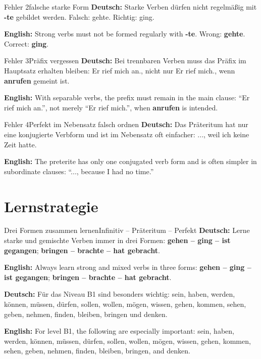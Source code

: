 \documentclass[a4paper,11pt]{article}
\newcommand{\GermanText}[1]{\textbf{Deutsch: }#1\par}
\newcommand{\EnglishText}[1]{{\small\color{SoftGray}\textbf{English: }#1\par}}
\begin{document}
        \begin{grammarentry}{Fehler 2}{falsche starke Form}
            \GermanText{Starke Verben dürfen nicht regelmäßig mit \textbf{-te} gebildet werden. Falsch: \glqq gehte\grqq. Richtig: \glqq ging\grqq.}
            \EnglishText{Strong verbs must not be formed regularly with \textbf{-te}. Wrong: \textbf{gehte}. Correct: \textbf{ging}.}
        \end{grammarentry}
        
        \begin{grammarentry}{Fehler 3}{Präfix vergessen}
            \GermanText{Bei trennbaren Verben muss das Präfix im Hauptsatz erhalten bleiben: \glqq Er rief mich an.\grqq, nicht nur \glqq Er rief mich.\grqq, wenn \textbf{anrufen} gemeint ist.}
            \EnglishText{With separable verbs, the prefix must remain in the main clause: ``Er rief mich an.'', not merely ``Er rief mich.'', when \textbf{anrufen} is intended.}
        \end{grammarentry}
        
        \begin{grammarentry}{Fehler 4}{Perfekt im Nebensatz falsch ordnen}
            \GermanText{Das Präteritum hat nur eine konjugierte Verbform und ist im Nebensatz oft einfacher: \glqq ..., weil ich keine Zeit hatte.\grqq}
            \EnglishText{The preterite has only one conjugated verb form and is often simpler in subordinate clauses: ``..., because I had no time.''}
        \end{grammarentry}
    
    
    \section{Lernstrategie}
        
        \begin{grammarentry}{Drei Formen zusammen lernen}{Infinitiv -- Präteritum -- Perfekt}
            \GermanText{Lerne starke und gemischte Verben immer in drei Formen: \textbf{gehen -- ging -- ist gegangen}; \textbf{bringen -- brachte -- hat gebracht}.}
            \EnglishText{Always learn strong and mixed verbs in three forms: \textbf{gehen -- ging -- ist gegangen}; \textbf{bringen -- brachte -- hat gebracht}.}
            
            \GermanText{Für das Niveau B1 sind besonders wichtig: sein, haben, werden, können, müssen, dürfen, sollen, wollen, mögen, wissen, gehen, kommen, sehen, geben, nehmen, finden, bleiben, bringen und denken.}
            \EnglishText{For level B1, the following are especially important: sein, haben, werden, können, müssen, dürfen, sollen, wollen, mögen, wissen, gehen, kommen, sehen, geben, nehmen, finden, bleiben, bringen, and denken.}
        \end{grammarentry}
    
\end{document}
